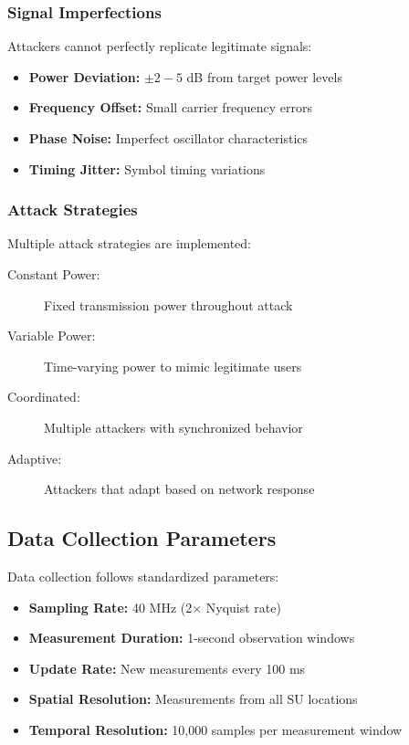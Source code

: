 \subsubsection{Signal Imperfections}
Attackers cannot perfectly replicate legitimate signals:
\begin{itemize}
\item \textbf{Power Deviation:} $\pm 2-5$ dB from target power levels
\item \textbf{Frequency Offset:} Small carrier frequency errors
\item \textbf{Phase Noise:} Imperfect oscillator characteristics
\item \textbf{Timing Jitter:} Symbol timing variations
\end{itemize}

\subsubsection{Attack Strategies}
Multiple attack strategies are implemented:
\begin{description}
\item[Constant Power:] Fixed transmission power throughout attack
\item[Variable Power:] Time-varying power to mimic legitimate users
\item[Coordinated:] Multiple attackers with synchronized behavior
\item[Adaptive:] Attackers that adapt based on network response
\end{description}

\subsection{Data Collection Parameters}
Data collection follows standardized parameters:

\begin{itemize}
\item \textbf{Sampling Rate:} 40 MHz (2× Nyquist rate)
\item \textbf{Measurement Duration:} 1-second observation windows
\item \textbf{Update Rate:} New measurements every 100 ms
\item \textbf{Spatial Resolution:} Measurements from all SU locations
\item \textbf{Temporal Resolution:} 10,000 samples per measurement window
\end{itemize}

